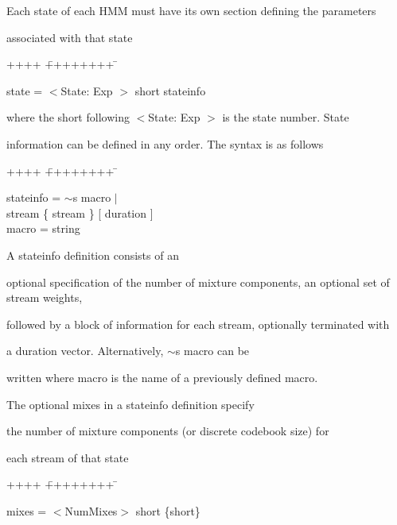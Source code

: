 Each state of each HMM must have its own section defining the parameters


associated with that state


{\sf


\begin{tabbing}


++++ \= ++++++++ \=  \kill


\> state =\>  $<$State: Exp $>$ short stateinfo


\end{tabbing}


}


\noindent


where the  short following {\sf $<$State: Exp $>$} is the state number.  State


information can be defined in any order.  The syntax is as follows


{\sf


\begin{tabbing}


++++ \= ++++++++ \=  \kill


\>   stateinfo = \> $\sim$s macro $|$ \\


  \>\>              [ mixes ] [ weights ] stream \{ stream \} [ duration ] \\


\>   macro     = \> string


\end{tabbing}


}


\noindent


A {\sf stateinfo} definition consists of an 


optional specification of the number of mixture components, an optional set of stream weights,


followed by a block of information for each stream, optionally terminated with


a duration vector.  Alternatively, {\sf $\sim$s macro} can be


written where {\sf macro} is the name of a previously defined macro.





The optional {\sf mixes} in a {\sf stateinfo} definition specify


the number of mixture components (or discrete codebook size) for 


each stream of that state


{\sf


\begin{tabbing}


++++ \= ++++++++ \=  \kill


\>   mixes = \>  $<$NumMixes$>$ short \{short\}


\end{tabbing}


}


